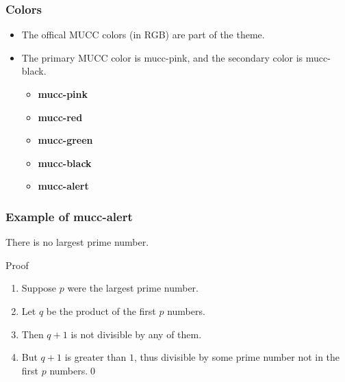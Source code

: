 \documentclass[aspectratio=169]{beamer}
\begin{document}
\begin{frame}
    \frametitle{Colors}
    \begin{itemize}
        \item The offical MUCC colors (in RGB) are part of the theme.
        \item The primary MUCC color is {\color{mucc-pink} mucc-pink}, and the secondary color is {\color{mucc-black} mucc-black}.
            \begin{center}
                \begin{minipage}[t]{.35\textwidth}
                    \begin{itemize}
                        \item {\color{mucc-pink}  \textbf{mucc-pink}}
                        \item {\color{mucc-red}    \textbf{mucc-red}}
                        \item {\color{mucc-green}   \textbf{mucc-green}}
                    \end{itemize}
                \end{minipage}%
                \begin{minipage}[t]{.35\textwidth}
                    \begin{itemize}
                        \item {\color{mucc-black} \textbf{mucc-black}}
                        \item {\color{mucc-alert} \textbf{mucc-alert}}
                    \end{itemize}
                \end{minipage}
                \vspace{.5cm}
            \end{center}
    \end{itemize}
\end{frame}

\begin{frame}
    \frametitle{Example of mucc-alert}
    \begin{theorem}
        There is no largest prime number.
    \end{theorem}
    \pause
    \begin{block}{Proof}
        \begin{enumerate}
            \item<2-| alert@2> Suppose $p$ were the largest prime number.
            \item<3-| alert@3> Let $q$ be the product of the first $p$ numbers.
            \item<4-| alert@4> Then $q+1$ is not divisible by any of them.
            \item<5-6| alert@5> But $q + 1$ is greater than $1$, thus divisible by some prime number not in the first $p$ numbers.\qed
        \end{enumerate}
    \end{block}
\end{frame}
\end{document}
